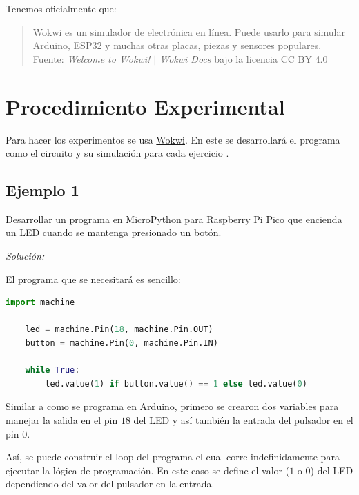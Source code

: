 \documentclass{article}
\begin{document}
    \bigbreak

    Tenemos oficialmente que:

    \begin{quote}
        Wokwi es un simulador de electrónica en línea. Puede usarlo para simular Arduino, ESP32 y muchas otras placas, piezas y sensores populares.
        \\ \footnotesize
        Fuente: \textit{Welcome to Wokwi! $\mid$ Wokwi Docs} bajo la licencia CC BY 4.0
    \end{quote}

    \section{Procedimiento Experimental}\label{sec:procedimiento-experimental}

    Para hacer los experimentos se usa \href{https://wokwi.com}{Wokwi}. En
    este se desarrollará el programa como el circuito y su simulación para cada ejercicio  \cite{ricardo-adonis-caraccioli-abrego-2022}.

    \subsection{Ejemplo 1}

    Desarrollar un programa en MicroPython para Raspberry Pi Pico que encienda un LED cuando se mantenga presionado un botón.

    \bigbreak

    \textit{Solución:}

    \bigbreak

    El programa que se necesitará es sencillo:

    \begin{lstlisting}[language=Python, caption={Programa para el ejemplo 1}]
    import machine

    led = machine.Pin(18, machine.Pin.OUT)
    button = machine.Pin(0, machine.Pin.IN)

    while True:
        led.value(1) if button.value() == 1 else led.value(0)
    \end{lstlisting}

    Similar a como se programa en Arduino, primero se crearon dos variables para manejar la salida en el pin $18$ del LED y así también la entrada del pulsador en el pin $0$.

    \bigbreak

    Así, se puede construir el loop del programa el cual corre indefinidamente para ejecutar la lógica de programación. En este caso se define el valor ($1$ o $0$) del LED dependiendo del valor del pulsador en la entrada.
\end{document}
